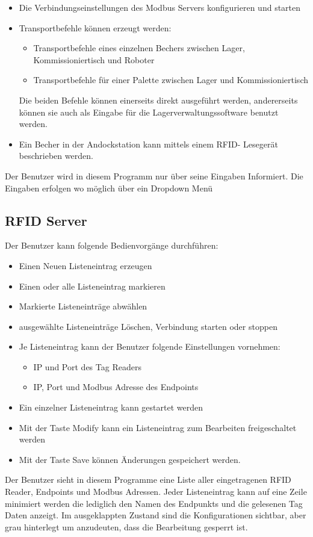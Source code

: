 \begin{itemize}
    \item Die Verbindungseinstellungen des Modbus Servers konfigurieren und starten
    \item Transportbefehle können erzeugt werden:
    \begin{itemize}
        \item Transportbefehle eines einzelnen Bechers zwischen Lager, Kommissioniertisch und Roboter
        \item Transportbefehle für einer Palette zwischen Lager und Kommissioniertisch
    \end{itemize}
    Die beiden Befehle können einerseits direkt ausgeführt werden, andererseits können sie auch als Eingabe für die
    Lagerverwaltungssoftware benutzt werden.
    \item Ein Becher in der Andockstation kann mittels einem RFID- Lesegerät beschrieben werden.
\end{itemize}

Der Benutzer wird in diesem Programm nur über seine Eingaben Informiert.
Die Eingaben erfolgen wo möglich über ein Dropdown Menü

\subsection{RFID Server}

Der Benutzer kann folgende Bedienvorgänge durchführen: \\

\begin{itemize}
    \item Einen Neuen Listeneintrag erzeugen
    \item Einen oder alle Listeneintrag markieren
    \item Markierte Listeneinträge abwählen
    \item ausgewählte Listeneinträge Löschen, Verbindung starten oder stoppen
    \item Je Listeneintrag kann der Benutzer folgende Einstellungen vornehmen:
    \begin{itemize}
        \item IP und Port des Tag Readers
        \item IP, Port und Modbus Adresse des Endpoints
    \end{itemize}
    \item Ein einzelner Listeneintrag kann gestartet werden
    \item Mit der Taste \glqq Modify \grqq kann ein Listeneintrag zum Bearbeiten freigeschaltet werden
    \item Mit der Taste \glqq Save \grqq können Änderungen gespeichert werden.
\end{itemize}

Der Benutzer sieht in diesem Programme eine Liste aller eingetragenen RFID Reader, Endpoints und Modbus Adressen.
Jeder Listeneintrag kann auf eine Zeile minimiert werden die lediglich den Namen des Endpunkts und die gelesenen
Tag Daten anzeigt.
Im ausgeklappten Zustand sind die Konfigurationen sichtbar, aber grau hinterlegt um anzudeuten, dass die Bearbeitung
gesperrt ist.


